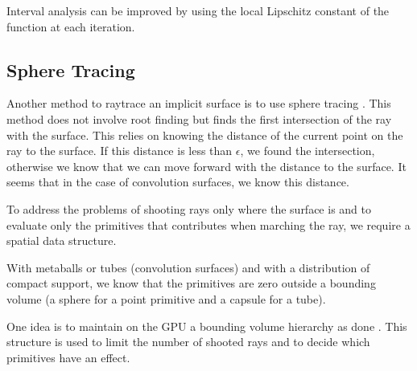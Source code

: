 \documentclass[11pt]{article}
\numberwithin{figure}{section}
\begin{document}
Interval analysis can be improved by using the local Lipschitz constant of the function at each iteration.

\subsection{Sphere Tracing}

Another method to raytrace an implicit surface is to use sphere tracing \cite{springerlink:10.1007/s003710050084}. 
This method does not involve root finding but finds the first intersection of the ray with the surface.
This relies on knowing the distance of the current point on the ray to the surface. If this distance is less than $\epsilon$, we found the intersection, otherwise we know that we can move forward with the distance to the surface. It seems that in the case of convolution surfaces, we know this distance.


To address the problems of shooting rays only where the surface is and to evaluate only the primitives that contributes when marching the ray, we require a spatial data structure.

With metaballs or tubes (convolution surfaces) and with a distribution of compact support, we know that the primitives are zero outside a bounding volume (a sphere for a point primitive and a capsule for a tube).

One idea is to maintain on the GPU a bounding volume hierarchy as done \cite{Gourmel-2010-FBVH}.
This structure is used to limit the number of shooted rays and to decide which primitives have an effect.

\clearpage
 

 

\end{document}
